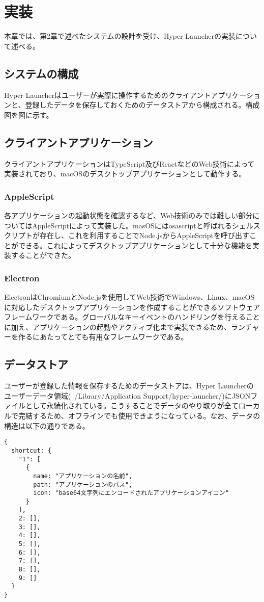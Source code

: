 \chapter{実装}

本章では、第2章で述べたシステムの設計を受け、Hyper Launcherの実装について述べる。

\section{システムの構成}

Hyper Launcherはユーザーが実際に操作するためのクライアントアプリケーションと、登録したデータを保存しておくためのデータストアから構成される。構成図を図に示す。

\section{クライアントアプリケーション}

クライアントアプリケーションはTypeScript及びReactなどのWeb技術によって実装されており、macOSのデスクトップアプリケーションとして動作する。

\subsection{AppleScript}

各アプリケーションの起動状態を確認するなど、Web技術のみでは難しい部分についてはAppleScriptによって実装した。masOSにはosascriptと呼ばれるシェルスクリプトが存在し、これを利用することでNode.jsからAppleScriptを呼び出すことができる。これによってデスクトップアプリケーションとして十分な機能を実装することができた。

\subsection{Electron}

ElectronはChromiumとNode.jsを使用してWeb技術でWindows、Linux、macOSに対応したデスクトップアプリケーションを作成することができるソフトウェアフレームワークである。グローバルなキーイベントのハンドリングを行えることに加え、アプリケーションの起動やアクティブ化まで実装できるため、ランチャーを作るにあたってとても有用なフレームワークである。

\section{データストア}

ユーザーが登録した情報を保存するためのデータストアは、Hyper Launcherのユーザーデータ領域(~/Library/Application Support/hyper-launcher/)にJSONファイルとして永続化されている。こうすることでデータのやり取りが全てローカルで完結するため、オフラインでも使用できようになっている。なお、データの構造は以下の通りである。

\begin{lstlisting}[caption=config.json]
{
  shortcut: {
    "1": [
      {
        name: "アプリケーションの名前",
        path: "アプリケーションのパス",
        icon: "base64文字列にエンコードされたアプリケーションアイコン"
      }
    ],
    2: [],
    3: [],
    4: [],
    5: [],
    6: [],
    7: [],
    8: [],
    9: []
  }
}
\end{lstlisting}